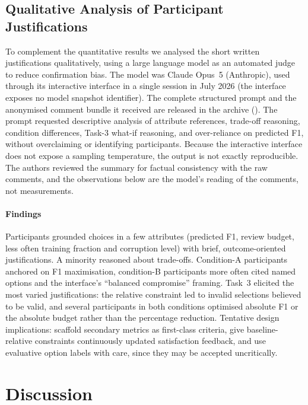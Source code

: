 \documentclass[final,5p,times,twocolumn]{elsarticle}
\begin{document}
\subsection{Qualitative Analysis of Participant Justifications}
\label{subsec:justification-analysis}

To complement the quantitative results we analysed the short written
justifications qualitatively, using a large language model as an
automated judge \cite{zheng_judging_2023} to reduce confirmation bias.
The model was Claude Opus~5 (Anthropic), used through its interactive interface in a single session in July 2026 (the interface exposes no model snapshot identifier). The complete structured prompt and the
anonymised comment bundle it received are released in the archive
(). The prompt requested
descriptive analysis of attribute references, trade-off reasoning,
condition differences, Task-3 what-if reasoning, and over-reliance on
predicted F1, without overclaiming or identifying participants. Because
the interactive interface does not expose a sampling temperature, the
output is not exactly reproducible. The authors reviewed the summary for
factual consistency with the raw comments, and the observations below
are the model's reading of the comments, not measurements.

\paragraph{Findings}
Participants grounded choices in a few attributes (predicted F1, review
budget, less often training fraction and corruption level) with brief,
outcome-oriented justifications. A minority reasoned about trade-offs.
Condition-A participants anchored on F1 maximisation, condition-B
participants more often cited named options and the interface's
``balanced compromise'' framing. Task~3 elicited the most varied
justifications: the relative constraint led to invalid selections
believed to be valid, and several participants in both conditions
optimised absolute F1 or the absolute budget rather than the percentage
reduction. Tentative design implications: scaffold secondary metrics as
first-class criteria, give baseline-relative constraints continuously
updated satisfaction feedback, and use evaluative option labels with
care, since they may be accepted uncritically.

\section{Discussion}
\label{sec:discussion}
\end{document}
